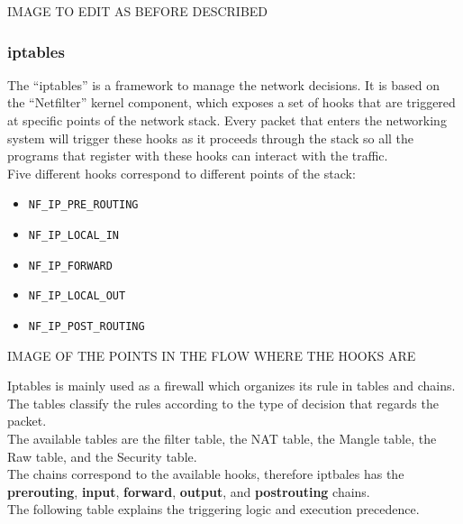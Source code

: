 \documentclass[]{article}
\begin{document}
	IMAGE TO EDIT AS BEFORE DESCRIBED\\

	\subsubsection{iptables}

	The ``iptables'' is a framework to manage the network decisions. It is based on the ``Netfilter'' kernel component, which exposes a set of hooks that are triggered at specific points of the network stack. Every packet that enters the networking system will trigger these hooks as it proceeds through the stack so all the programs that register with these hooks can interact with the traffic.\\
	Five different hooks correspond to different points of the stack:\\

	\begin{itemize}
		\item \lstinline{NF_IP_PRE_ROUTING}
		\item \lstinline{NF_IP_LOCAL_IN}
		\item \lstinline{NF_IP_FORWARD}
		\item \lstinline{NF_IP_LOCAL_OUT}
		\item \lstinline{NF_IP_POST_ROUTING}
	\end{itemize}

	IMAGE OF THE POINTS IN THE FLOW WHERE THE HOOKS ARE
	
	Iptables is mainly used as a firewall which organizes its rule in tables and chains. The tables classify the rules according to the type of decision that regards the packet.\\
	The available tables are the filter table, the NAT table, the Mangle table, the Raw table, and the Security table.\\
	The chains correspond to the available hooks, therefore iptbales has the \textbf{prerouting}, \textbf{input}, \textbf{forward}, \textbf{output}, and \textbf{postrouting} chains.\\
	The following table explains the triggering logic and execution precedence.\\
\end{document}
